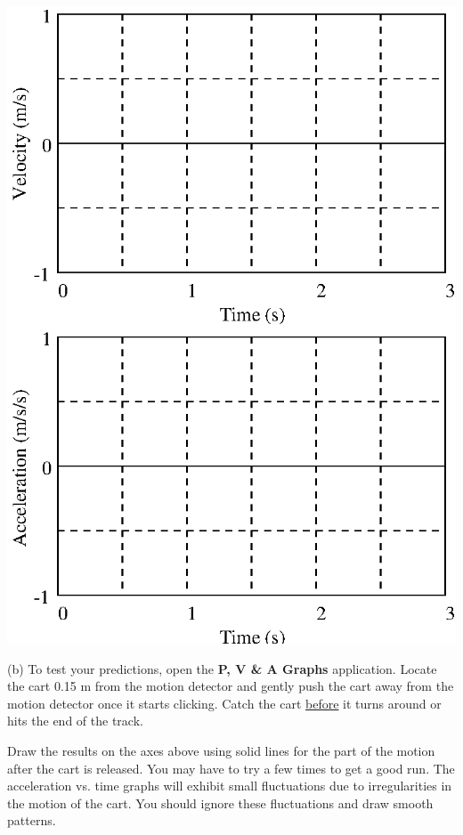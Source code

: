 \vspace{0.3cm}
{\par\centering \includegraphics{slowing/slowing_fig1.eps} \par}
\vspace{0.3cm}

(b) To test your predictions, open the \textbf{P, V \& A Graphs} application. Locate the cart 0.15 m from the motion detector and gently push the cart away from the motion detector once it starts clicking. Catch the cart \underline{before} it turns around or hits the end of the track.

Draw the results on the axes above using solid lines for the part of the motion
after the cart is released. You may have to try a few times to get a good run.  The acceleration vs. time graphs will exhibit small fluctuations due to irregularities in the motion of the cart. You should ignore these fluctuations and draw smooth patterns.

